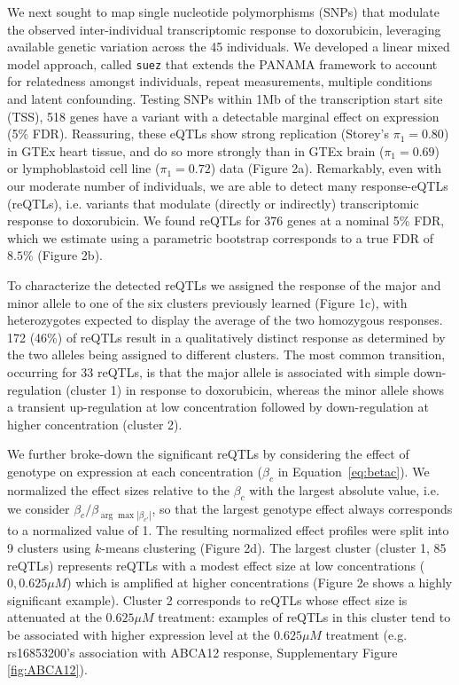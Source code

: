 \documentclass{article}
\begin{document}
We next sought to map single nucleotide polymorphisms (SNPs) that modulate the observed inter-individual transcriptomic response to doxorubicin, leveraging available genetic variation across the 45 individuals\cite{todo}. We developed a linear mixed model approach, called \texttt{suez} that extends the PANAMA framework\citep{Fusi2012} to account for relatedness amongst individuals, repeat measurements, multiple conditions and latent confounding. Testing SNPs within 1Mb of the transcription start site (TSS), 518 genes have a variant with a detectable marginal effect on expression (5\% FDR). Reassuring, these eQTLs show strong replication (Storey's $\pi_1=0.80$) in GTEx heart tissue, and do so more strongly than in GTEx brain ($\pi_1=0.69$) or lymphoblastoid cell line ($\pi_1=0.72$) data (Figure 2a). Remarkably, even with our moderate number of individuals, we are able to detect many response-eQTLs (reQTLs), i.e. variants that modulate (directly or indirectly) transcriptomic response to doxorubicin. We found reQTLs for 376 genes at a nominal 5\% FDR, which we estimate using a parametric bootstrap corresponds to a true FDR of $8.5\%$ (Figure 2b). 

To characterize the detected reQTLs we assigned the response of the major and minor allele to one of the six clusters previously learned (Figure 1c), with heterozygotes expected to display the average of the two homozygous responses. 172 (46\%) of reQTLs result in a qualitatively distinct response as determined by the two alleles being assigned to different clusters. The most common transition, occurring for 33 reQTLs, is that the major allele is associated with simple down-regulation (cluster 1) in response to doxorubicin, whereas the minor allele shows a transient up-regulation at low concentration followed by down-regulation at higher concentration (cluster 2). 

We further broke-down the significant reQTLs by considering the effect of genotype on expression at each concentration ($\beta_c$ in Equation~\ref{eq:betac}). We normalized the effect sizes relative to the $\beta_c$ with the largest absolute value, i.e. we consider $\beta_c / \beta_{\arg \max{ |\beta_{c'}| }} $, so that the largest genotype effect always corresponds to a normalized value of 1. The resulting normalized effect profiles were split into 9 clusters using $k$-means clustering (Figure 2d). The largest cluster (cluster 1, 85 reQTLs) represents reQTLs with a modest effect size at low concentrations ($0,0.625\mu M$) which is amplified at higher concentrations (Figure 2e shows a highly significant example). Cluster 2 corresponds to reQTLs whose effect size is attenuated at the $0.625\mu M$ treatment: examples of reQTLs in this cluster tend to be associated with higher expression level at the $0.625\mu M$ treatment (e.g. rs16853200's association with ABCA12 response, Supplementary Figure \ref{fig:ABCA12}). 
\end{document}
